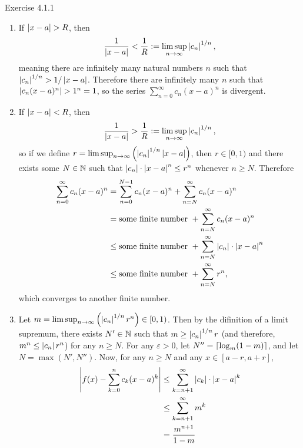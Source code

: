 \documentclass{article}
\begin{document}
\bigskip
\begin{prob}
    Exercise 4.1.1
\end{prob}
\begin{enumerate}[label=(\alph*)]
    \item If $\left\lvert x-a \right\rvert>R$, then
        \[ \frac{1}{\left\lvert x-a \right\rvert} < \frac{1}{R} := \limsup_{n \rightarrow \infty} \left\lvert c_n \right\rvert^{1/n}, \]
        meaning there are infinitely many natural numbers $n$ such that $\left\lvert c_n \right\rvert^{1/n} > 1/\left\lvert x-a \right\rvert$. Therefore there are infinitely many $n$ such that $\left\lvert c_n (x-a)^n \right\rvert > 1^n=1$, so the series $\sum_{n=0}^\infty c_n (x-a)^n$ is divergent.
    \item If $\left\lvert x-a \right\rvert<R$, then
        \[ \frac{1}{\left\lvert x-a \right\rvert} > \frac{1}{R} := \limsup_{n \rightarrow \infty} \left\lvert c_n \right\rvert^{1/n}, \]
        so if we define $r = \limsup_{n \rightarrow \infty} \left( \left\lvert c_n \right\rvert^{1/n} \left\lvert x-a \right\rvert \right)$, then $r \in [0, 1)$ and there exists some $N \in \mathbb{N}$ such that $\left\lvert c_n \right\rvert\cdot \left\lvert x-a \right\rvert^n \leq r^n$ whenever $n \geq N$. Therefore
        \begin{align*}
            \sum_{n=0}^\infty c_n (x-a)^n &= \sum_{n=0}^{N-1} c_n (x-a)^n + \sum_{n=N}^\infty c_n (x-a)^n \\
                                          &= \text{some finite number } + \sum_{n=N}^\infty c_n (x-a)^n \\
                                          &\leq \text{some finite number } + \sum_{n=N}^\infty \left\lvert c_n \right\rvert \cdot \left\lvert x-a \right\rvert^n \\
                                          &\leq \text{some finite number } + \sum_{n=N}^\infty r^n, \\
        \end{align*}
        which converges to another finite number.
    \item Let $m = \limsup_{n \rightarrow \infty} \left( \left\lvert c_n \right\rvert^{1/n} r^n \right) \in [0, 1)$. Then by the difinition of a limit supremum, there exists $N' \in \mathbb{N}$ such that $m \geq \left\lvert c_n \right\rvert^{1/n} r$ (and therefore, $m^n \leq \left\lvert c_n \right\rvert r^n$) for any $n \geq N$. For any $\varepsilon > 0$, let $N'' = \left\lceil \log_m(1-m) \right\rceil$, and let $N =\max(N', N'')$. Now, for any $n \geq N$ and any $x \in [a-r,a+r]$,
        \begin{align*}
            \abs{f(x) - \sum_{k=0}^n c_k (x-a)^k} &\leq \sum_{k=n+1}^\infty \abs{c_k} \cdot \abs{x-a}^k \\
                                                  & \leq \sum_{k=n+1}^\infty m^k \\
                                                  &= \frac{m^{n+1}}{1-m} \\

\end{align*}
\end{enumerate}
\end{document}
